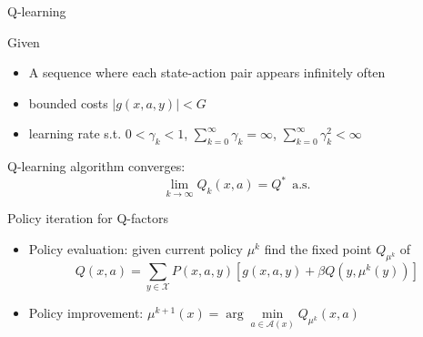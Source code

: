 \documentclass{beamer}
\def\X{{\mathcal X}}
\def\A{{\mathcal A}}
\begin{document}
\begin{frame}{ Q-learning}
\begin{theorem}


 Given

 \begin{itemize}
 \item A sequence where each state-action pair appears infinitely often
   \item bounded costs $|g(x, a, y)|<G$
   \item learning rate s.t.  $0<\gamma_k<1$, $\sum\limits_{k=0}^\infty \gamma_k = \infty$, $\sum\limits_{k=0}^\infty \gamma_k^2 < \infty$
 \end{itemize}

Q-learning algorithm converges:
$$
\lim\limits_{k\rightarrow \infty} Q_k(x, a) = Q^*~~\text{a.s.}
$$


\end{theorem}


\end{frame}



\begin{frame}{Policy iteration for Q-factors}
\begin{itemize}
  \item Policy evaluation: given current policy $\mu^k$ find the fixed point $Q_{\mu^k}$ of
  $$
  Q(x, a) = \sum\limits_{y\in \X} P(x, a, y)[g(x, a, y)+\beta Q(y, \mu^k(y))]
  $$
  \item Policy improvement: $\mu^{k+1}(x) = \arg\min\limits_{a\in \A(x)} Q_{\mu^k} (x, a)$
\end{itemize}

\end{frame}
\end{document}

